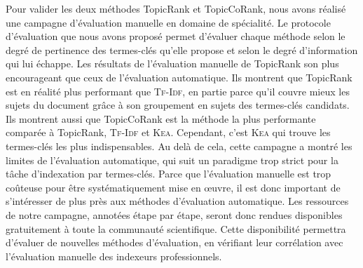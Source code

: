     Pour valider les deux méthodes TopicRank et TopicCoRank, nous avons réalisé
    une campagne d'évaluation manuelle en domaine de spécialité. Le protocole
    d'évaluation que nous avons proposé permet d'évaluer chaque méthode selon le
    degré de pertinence des termes-clés qu'elle propose et selon le degré
    d'information qui lui échappe. Les résultats de l'évaluation manuelle de
    TopicRank son plus encourageant que ceux de l'évaluation automatique. Ils
    montrent que TopicRank est en réalité plus performant que \textsc{Tf-Idf},
    en partie parce qu'il couvre mieux les sujets du document grâce à son
    groupement en sujets des termes-clés candidats.
    Ils montrent aussi que TopicCoRank est la méthode la plus performante
    comparée à TopicRank, \textsc{Tf-Idf} et \textsc{Kea}. Cependant, c'est
    \textsc{Kea} qui trouve les termes-clés les plus indispensables.
    Au delà de cela, cette
    campagne a montré les limites de l'évaluation automatique, qui suit un
    paradigme trop strict pour la tâche d'indexation par termes-clés. Parce que
    l'évaluation manuelle est trop coûteuse pour être systématiquement mise en
    \oe{}uvre, il est donc important de s'intéresser de plus près aux méthodes
    d'évaluation automatique. Les ressources de notre campagne, annotées étape
    par étape, seront donc
    rendues disponibles gratuitement à toute la communauté scientifique. Cette
    disponibilité permettra d'évaluer de nouvelles méthodes d'évaluation, en
    vérifiant leur corrélation avec l'évaluation manuelle des indexeurs
    professionnels.


